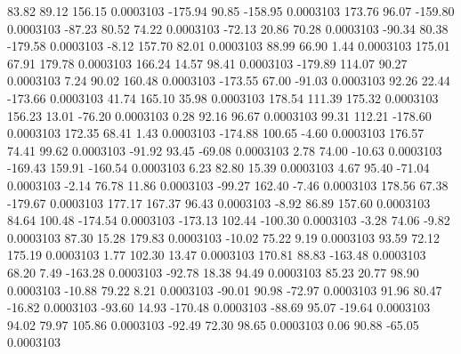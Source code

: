        83.82       89.12      156.15     0.0003103
     -175.94       90.85     -158.95     0.0003103
      173.76       96.07     -159.80     0.0003103
      -87.23       80.52       74.22     0.0003103
      -72.13       20.86       70.28     0.0003103
      -90.34       80.38     -179.58     0.0003103
       -8.12      157.70       82.01     0.0003103
       88.99       66.90        1.44     0.0003103
      175.01       67.91      179.78     0.0003103
      166.24       14.57       98.41     0.0003103
     -179.89      114.07       90.27     0.0003103
        7.24       90.02      160.48     0.0003103
     -173.55       67.00      -91.03     0.0003103
       92.26       22.44     -173.66     0.0003103
       41.74      165.10       35.98     0.0003103
      178.54      111.39      175.32     0.0003103
      156.23       13.01      -76.20     0.0003103
        0.28       92.16       96.67     0.0003103
       99.31      112.21     -178.60     0.0003103
      172.35       68.41        1.43     0.0003103
     -174.88      100.65       -4.60     0.0003103
      176.57       74.41       99.62     0.0003103
      -91.92       93.45      -69.08     0.0003103
        2.78       74.00      -10.63     0.0003103
     -169.43      159.91     -160.54     0.0003103
        6.23       82.80       15.39     0.0003103
        4.67       95.40      -71.04     0.0003103
       -2.14       76.78       11.86     0.0003103
      -99.27      162.40       -7.46     0.0003103
      178.56       67.38     -179.67     0.0003103
      177.17      167.37       96.43     0.0003103
       -8.92       86.89      157.60     0.0003103
       84.64      100.48     -174.54     0.0003103
     -173.13      102.44     -100.30     0.0003103
       -3.28       74.06       -9.82     0.0003103
       87.30       15.28      179.83     0.0003103
      -10.02       75.22        9.19     0.0003103
       93.59       72.12      175.19     0.0003103
        1.77      102.30       13.47     0.0003103
      170.81       88.83     -163.48     0.0003103
       68.20        7.49     -163.28     0.0003103
      -92.78       18.38       94.49     0.0003103
       85.23       20.77       98.90     0.0003103
      -10.88       79.22        8.21     0.0003103
      -90.01       90.98      -72.97     0.0003103
       91.96       80.47      -16.82     0.0003103
      -93.60       14.93     -170.48     0.0003103
      -88.69       95.07      -19.64     0.0003103
       94.02       79.97      105.86     0.0003103
      -92.49       72.30       98.65     0.0003103
        0.06       90.88      -65.05     0.0003103
